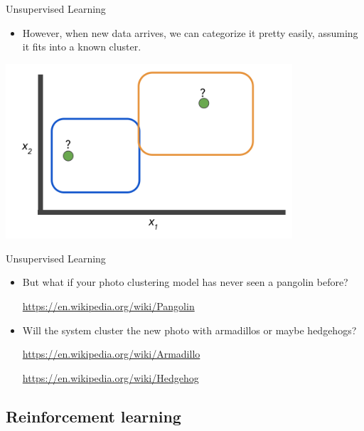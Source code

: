 \documentclass{beamer}
\begin{document}

\begin{frame}{Unsupervised Learning}

\begin{itemize}
\item However, when new data arrives, we can categorize it pretty easily, assuming it fits into a known cluster. 

\end{itemize}

\includegraphics[width=0.8\textwidth]{images/Graph7.png}

\end{frame}


\begin{frame}{Unsupervised Learning}

\begin{itemize}
\item But what if your photo clustering model has never seen a pangolin before? 

\url{https://en.wikipedia.org/wiki/Pangolin}

\item Will the system cluster the new photo with armadillos or maybe hedgehogs? 

\url{https://en.wikipedia.org/wiki/Armadillo}

\url{https://en.wikipedia.org/wiki/Hedgehog}
\end{itemize}

\end{frame}


\subsection{Reinforcement learning}
\end{document}
